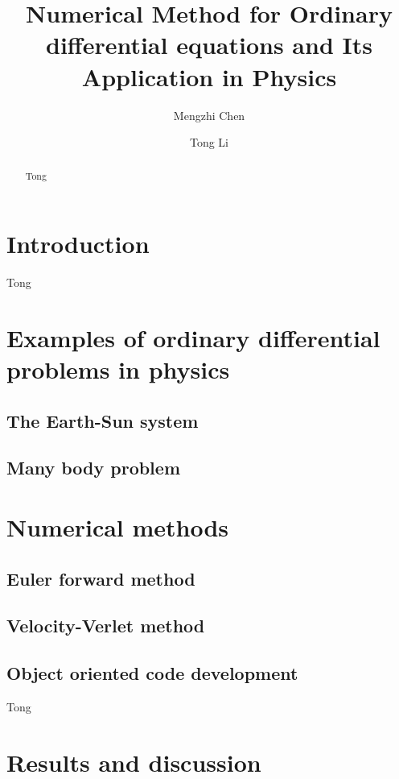 \documentclass{article}
\title{Numerical Method for Ordinary differential equations and Its Application in Physics}
\author[1]{Mengzhi Chen}
\author[1]{Tong Li}
\affil[1]{Department of Physics and Astronomy, Michigan State University}
\date{}
\begin{document}
	\maketitle
	\begin{abstract}\label{abstract}
Tong
	\end{abstract}

\section{Introduction}\label{intro} 
	Tong
	
\section{Examples of ordinary differential problems in physics}\label{physcis_problem}
	
	\subsection{The Earth-Sun system}\label{earthsun}
	
	
	\subsection{Many body problem}\label{quantumdot}
	
	
\section{Numerical methods}\label{method}
  
	\subsection{Euler forward method}\label{euler}
	
	
	\subsection{Velocity-Verlet method} \label{verlet}
	
	
	\subsection{Object oriented code development}\label{obj}
	Tong
	
\section{Results and discussion}\label{results}
\end{document}
